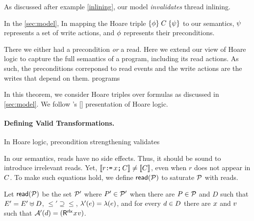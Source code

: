

As discussed after example \eqref{inlining}, our model {\em invalidates}
thread inlining.


In the \textsection\ref{sec:model}, 
In mapping the Hoare triple $\{\phi\}\allowbreak\;C\;\allowbreak\{\psi\}$ to our semantics,
$\psi$ represents a set of write actions, and $\phi$ represents their
preconditions.

There we either had a precondition \emph{or} a read.  Here we extend our view
of Hoare logic to capture the full semantics of a program, including its read
actions.  As such, the preconditions correponsd to read events and the write
actions are the writes that depend on them.
programs 

In this theorem, we consider Hoare triples over formulas as discussed in
\textsection\ref{sec:model}.  
We follow \citeauthor{gordonHoare}'s
[\citeyear{gordonHoare}] presentation of Hoare logic.

\paragraph*{Defining Valid Transformations.}
In Hoare logic, precondition strengthening validates

In our semantics, reads have no side effects.  Thus, it should be sound to
introduce irrelevant reads.  Yet, $\llbracket r\texttt{:}\mkern-1mu\texttt{=}\, x\texttt{;}\,\allowbreak C\rrbracket\neq
\llbracket C\rrbracket$, even when $r$ does not appear in $C$.  To make
such equations hold, we define ${\mathsf{read}}(\mathcal{P})$ to saturate $\mathcal{P}$ with
reads.

Let ${\mathsf{read}}(\mathcal{P})$ be the set $\mathcal{P}'$ where $P'\in\mathcal{P}'$ when there are
$P\in\mathcal{P}$ and $D$ such that $E'= E'\uplus D$,
${\le'} \supseteq{\le}$, $\lambda'(e) = \lambda(e)$, and for every
$d\in D$ there are $x$ and $v$ such that $\labelingAct'(\bEv)=(\DR[\modeRLX]{\aLoc}{\aVal})$.

